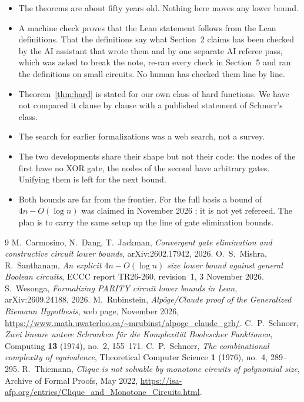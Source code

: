 \documentclass[11pt]{amsart}
\theoremstyle{definition}
\theoremstyle{remark}
\begin{document}
\begin{itemize}
\item The theorems are about fifty years old. Nothing here moves any lower bound.
\item A machine check proves that the Lean statement follows from the Lean definitions. That
  the definitions say what Section~2 claims has been checked by the AI assistant that wrote
  them and by one separate AI referee pass, which was asked to break the note, re-ran every
  check in Section~5 and ran the definitions on small circuits. No
  human has checked them line by line.
\item Theorem~\ref{thm:hard} is stated for our own class of hard functions. We have not compared
  it clause by clause with a published statement of Schnorr's class.
\item The search for earlier formalizations was a web search, not a survey.
\item The two developments share their shape but not their code: the nodes of the first have
  no XOR gate, the nodes of the second have arbitrary gates. Unifying them is left for the next
  bound.
\item Both bounds are far from the frontier. For the full basis a bound of $4n-O(\log n)$ was
  claimed in November 2026 \cite{MS26}; it is not yet refereed. The plan is to carry the same
  setup up the line of gate elimination bounds.
\end{itemize}

\begin{thebibliography}{9}
 M.~Carmosino, N.~Dang, T.~Jackman, \emph{Convergent gate elimination and
  constructive circuit lower bounds}, arXiv:2602.17942, 2026.
 O.~S.~Mishra, R.~Santhanam, \emph{An explicit $4n-O(\log n)$ size lower bound
  against general Boolean circuits}, ECCC report TR26-260, revision~1, 3 November 2026.
 S.~Wesonga, \emph{Formalizing PARITY circuit lower bounds in Lean},
  arXiv:2609.24188, 2026.
 M.~Rubinstein, \emph{Alp\"oge/Claude proof of the Generalized Riemann
  Hypothesis}, web page, November 2026,
  \url{https://www.math.uwaterloo.ca/~mrubinst/alpoge_claude_grh/}.
 C.~P.~Schnorr, \emph{Zwei lineare untere Schranken f\"ur die Komplexit\"at
  Boolescher Funktionen}, Computing \textbf{13} (1974), no.~2, 155--171.
 C.~P.~Schnorr, \emph{The combinational complexity of equivalence},
  Theoretical Computer Science \textbf{1} (1976), no.~4, 289--295.
 R.~Thiemann, \emph{Clique is not solvable by monotone circuits of
  polynomial size}, Archive of Formal Proofs, May 2022,
  \url{https://isa-afp.org/entries/Clique_and_Monotone_Circuits.html}.
\end{thebibliography}
\end{document}
